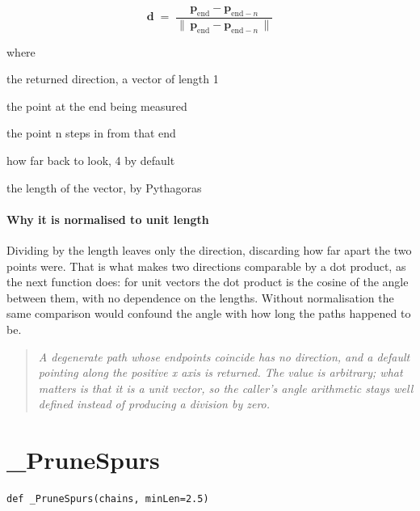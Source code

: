 \begin{equation}
\mathbf{d} \;=\; \frac{\mathbf{p}_{\mathrm{end}} - \mathbf{p}_{\mathrm{end}-n}}{\big\|\,\mathbf{p}_{\mathrm{end}} - \mathbf{p}_{\mathrm{end}-n}\,\big\|}
\end{equation}

\noindent where
\begin{description}[leftmargin=2.4em,style=nextline,font=\normalfont\ttfamily]\setlength\itemsep{1pt}
  \item[{$\mathbf{d}$}] \normalfont the returned direction, a vector of length 1
  \item[{$\mathbf{p}_{\mathrm{end}}$}] \normalfont the point at the end being measured
  \item[{$\mathbf{p}_{\mathrm{end}-n}$}] \normalfont the point n steps in from that end
  \item[{$n$}] \normalfont how far back to look, 4 by default
  \item[{$\|\cdot\|$}] \normalfont the length of the vector, by Pythagoras
\end{description}

\paragraph{Why it is normalised to unit length}
Dividing by the length leaves only the direction, discarding how far apart the two points were. That is what makes two directions comparable by a dot product, as the next function does: for unit vectors the dot product is the cosine of the angle between them, with no dependence on the lengths. Without normalisation the same comparison would confound the angle with how long the paths happened to be.


\begin{quote}\small\itshape A degenerate path whose endpoints coincide has no direction, and a default pointing along the positive x axis is returned. The value is arbitrary; what matters is that it is a unit vector, so the caller's angle arithmetic stays well defined instead of producing a division by zero.\end{quote}

\section{\_PruneSpurs}
\begin{lstlisting}[style=sig]
def _PruneSpurs(chains, minLen=2.5)
\end{lstlisting}

